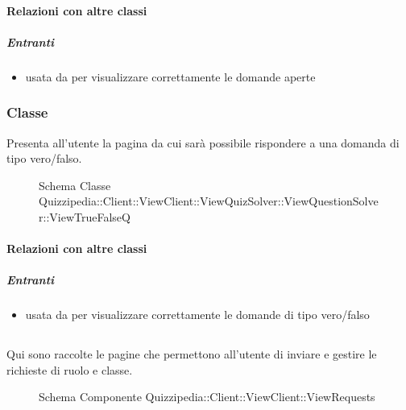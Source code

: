 \paragraph{Relazioni con altre classi}
\subparagraph{Entranti}
\begin{itemize}
\item usata da  per visualizzare correttamente le domande aperte
\end{itemize}
\subsubsection{Classe }
Presenta all'utente la pagina da cui sarà possibile rispondere a una domanda di tipo vero/falso.
\begin{figure}[H]
\centering
\noindent{}
\caption[Schema Classe ViewTrueFalseQ]{Schema Classe Quizzipedia::Client::ViewClient::ViewQuizSolver::ViewQuestionSolver::ViewTrueFalseQ}
\end{figure}
\paragraph{Relazioni con altre classi}
\subparagraph{Entranti}
\begin{itemize}
\item usata da  per visualizzare correttamente le domande di tipo vero/falso
\end{itemize}
\subsection{}
Qui sono raccolte le pagine che permettono all'utente di inviare e gestire le richieste di ruolo e classe.
\begin{figure}[H]
\centering
\noindent{}
\caption[Schema Componente Quizzipedia::Client::ViewClient::ViewRequests]{Schema Componente Quizzipedia::Client::ViewClient::ViewRequests}
\end{figure}

